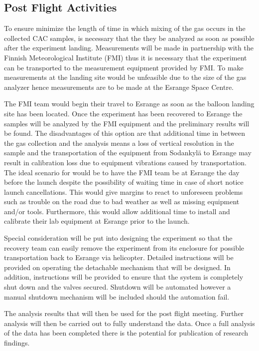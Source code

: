 \subsection{Post Flight Activities}

To ensure minimize the length of time in which mixing of the gas occurs in the collected CAC samples, is necessary that the they  be analyzed as soon as possible after the experiment landing. Measurements will be made in partnership with the Finnish Meteorological Institute (FMI) thus it is necessary that the experiment can be transported to the measurement equipment provided by FMI. To make measurements at the landing site would be unfeasible due to the size of the gas analyzer hence measurements are to be made at the Esrange Space Centre.

The FMI team would begin their travel to Esrange as soon as the balloon landing site has been located. Once the experiment has been recovered to Esrange the samples will be analyzed by the FMI equipment and the preliminary results will be found. The disadvantages of this option are that additional time in between the gas collection and the analysis means a loss of vertical resolution in the sample and the transportation of the equipment from Sodankylä to Esrange may result in calibration loss due to equipment vibrations caused by transportation. The ideal scenario for would be to have the FMI team be at Esrange the day before the launch despite the possibility of waiting time in case of short notice launch cancellations. This would give margins to react to unforeseen problems such as trouble on the road due to bad weather as well as missing equipment and/or tools. Furthermore, this would allow additional time to install and calibrate their lab equipment at Esrange prior to the launch.

Special consideration will be put into designing the experiment so that the recovery team can easily remove the experiment from its enclosure for possible transportation back to Esrange via helicopter. Detailed instructions will be provided on operating the detachable mechanism that will be designed. In addition, instructions will be provided to ensure that the system is completely shut down and the valves secured. Shutdown will be automated however a manual shutdown mechanism will be included should the automation fail.

The analysis results that will then be used for the post flight meeting. Further analysis will then be carried out to fully understand the data. Once a full analysis of the data has been completed there is the potential for publication of research findings.


